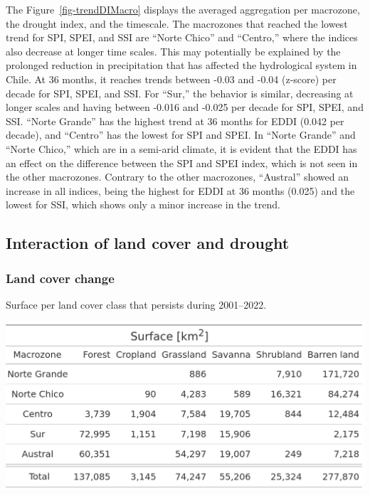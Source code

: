 \documentclass[
  authoryear,
  preprint,
  3p,
  onecolumn]{elsarticle}
\begin{document}
The Figure~\ref{fig-trendDIMacro} displays the averaged aggregation per
macrozone, the drought index, and the timescale. The macrozones that
reached the lowest trend for SPI, SPEI, and SSI are ``Norte Chico'' and
``Centro,'' where the indices also decrease at longer time scales. This
may potentially be explained by the prolonged reduction in precipitation
that has affected the hydrological system in Chile. At 36 months, it
reaches trends between -0.03 and -0.04 (z-score) per decade for SPI,
SPEI, and SSI. For ``Sur,'' the behavior is similar, decreasing at
longer scales and having between -0.016 and -0.025 per decade for SPI,
SPEI, and SSI. ``Norte Grande'' has the highest trend at 36 months for
EDDI (0.042 per decade), and ``Centro'' has the lowest for SPI and SPEI.
In ``Norte Grande'' and ``Norte Chico,'' which are in a semi-arid
climate, it is evident that the EDDI has an effect on the difference
between the SPI and SPEI index, which is not seen in the other
macrozones. Contrary to the other macrozones, ``Austral'' showed an
increase in all indices, being the highest for EDDI at 36 months (0.025)
and the lowest for SSI, which shows only a minor increase in the trend.

\hypertarget{interaction-of-land-cover-and-drought-1}{%
\subsection{Interaction of land cover and
drought}\label{interaction-of-land-cover-and-drought-1}}

\hypertarget{land-cover-change-1}{%
\subsubsection{Land cover change}\label{land-cover-change-1}}

\begin{table}[!ht]
\caption{Surface per land cover class that persists during 2001–2022.}
\label{tab-landcoverSurf}
\includegraphics[width = .5\textwidth]{../output/figs/table_surface_landcover_macrozone.png}
\end{table}
\end{document}
